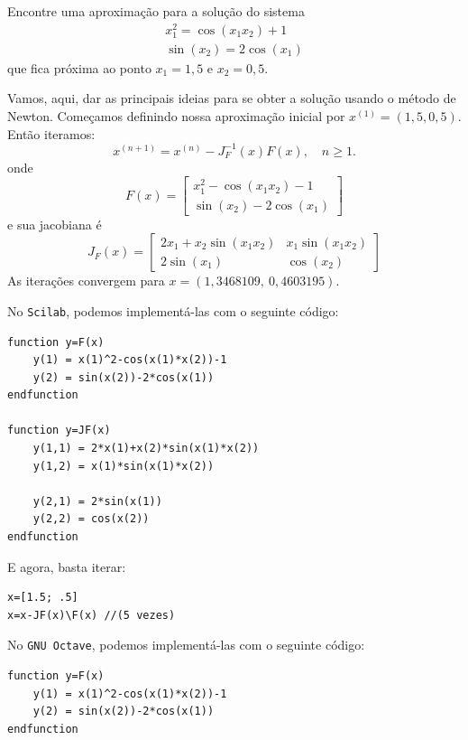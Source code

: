 \begin{ex} Encontre uma aproximação para a solução do sistema
\begin{eqnarray*}
x_1^2=\cos(x_1x_2)+1\\
\sin(x_2)=2\cos(x_1)
\end{eqnarray*}
que fica próxima ao ponto $x_1=1,5$ e $x_2=0,5$.
\end{ex}
\begin{sol} Vamos, aqui, dar as principais ideias para se obter a solução usando o método de Newton. 
Começamos definindo nossa aproximação inicial por $x^{(1)} = (1,5, 0,5)$. Então iteramos:
\begin{equation*}
  x^{(n+1)} = x^{(n)} - J_F^{-1}(x)F(x), \quad n\geq 1.
\end{equation*}
onde
  \begin{equation*}
    F(x)=\left[\begin{array}{c}
        \displaystyle x_1^2-\cos(x_1x_2)-1\\
        \displaystyle \sin(x_2)-2\cos(x_1)
      \end{array}\right]  
  \end{equation*}
e sua jacobiana é 
\begin{equation*}
  J_F(x) = \left[\begin{array}{cc}
    \displaystyle 2x_1 +x_2\sin(x_1x_2) & x_1\sin(x_1x_2)\\
    \displaystyle 2\sin(x_1) & \cos(x_2)
  \end{array}\right]
\end{equation*}
As iterações convergem para $x = (1,3468109,~0,4603195)$.

\ifisscilab
No \verb+Scilab+, podemos implementá-las com o seguinte código:
\begin{verbatim}
function y=F(x)
    y(1) = x(1)^2-cos(x(1)*x(2))-1
    y(2) = sin(x(2))-2*cos(x(1))
endfunction

function y=JF(x)
    y(1,1) = 2*x(1)+x(2)*sin(x(1)*x(2)) 
    y(1,2) = x(1)*sin(x(1)*x(2))

    y(2,1) = 2*sin(x(1)) 
    y(2,2) = cos(x(2))
endfunction
\end{verbatim}

E agora, basta iterar:
\begin{verbatim}
x=[1.5; .5]
x=x-JF(x)\F(x) //(5 vezes)
\end{verbatim}  
\fi
\ifisoctave
No \verb+GNU Octave+, podemos implementá-las com o seguinte código:
\begin{verbatim}
function y=F(x)
    y(1) = x(1)^2-cos(x(1)*x(2))-1
    y(2) = sin(x(2))-2*cos(x(1))
endfunction


\end{verbatim}
\end{sol}
